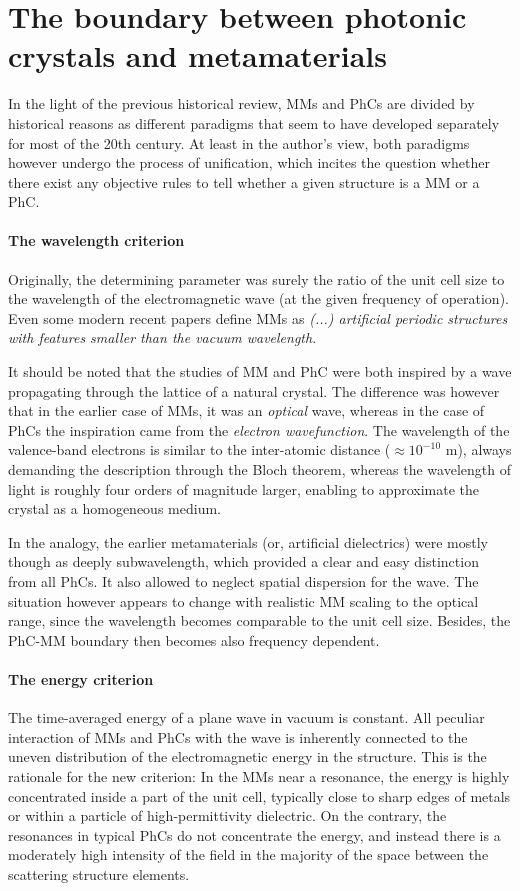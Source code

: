 

\section{The boundary between photonic crystals and metamaterials} 
In the light of the previous historical review, MMs and PhCs are divided by historical reasons as different paradigms that seem to have developed separately for most of the 20th century. At least in the author's view, both paradigms however undergo the process of unification, which incites the question whether there exist any objective rules to tell whether a given structure is a MM or a PhC.


\paragraph{The wavelength criterion} %
Originally, the determining parameter was surely the ratio of the unit cell size to the wavelength of the electromagnetic wave (at the given frequency of operation).
Even some modern recent papers \cite{tsukerman2011nonlocal} define MMs as \textit{(...) artificial periodic structures with features smaller than the vacuum wavelength}.

It should be noted that the studies of MM and PhC were both inspired by a wave propagating through the lattice of a natural crystal. The difference was however that in the earlier case of MMs, it was an \textit{optical} wave, whereas in the case of PhCs the inspiration came from the \textit{electron wavefunction}. The wavelength of the valence-band electrons is similar to the inter-atomic distance ($\approx 10^{-10}$ m), always demanding the description through the Bloch theorem, whereas the wavelength of light is roughly four orders of magnitude larger, enabling to approximate the crystal as a homogeneous medium.

In the analogy, the earlier metamaterials (or, artificial dielectrics) were mostly though as deeply subwavelength, which provided a clear and easy distinction from all PhCs. It also allowed to neglect spatial dispersion for the wave. The situation however appears to change with realistic MM scaling to the optical range, since the wavelength becomes comparable to the unit cell size. Besides, the PhC-MM boundary then becomes also frequency dependent.

\paragraph{The energy criterion} %
The time-averaged energy of a plane wave in vacuum is constant.  All peculiar interaction of MMs and PhCs with the wave is inherently connected to the uneven distribution of the electromagnetic energy in the structure. This is the rationale for the new criterion: In the MMs near a resonance, the energy is highly concentrated inside a part of the unit cell, typically close to sharp edges of metals or within a particle of high-permittivity dielectric. On the contrary, the resonances in typical PhCs do not concentrate the energy, and instead there is a moderately high intensity of the field in the majority of the space between the scattering structure elements.

